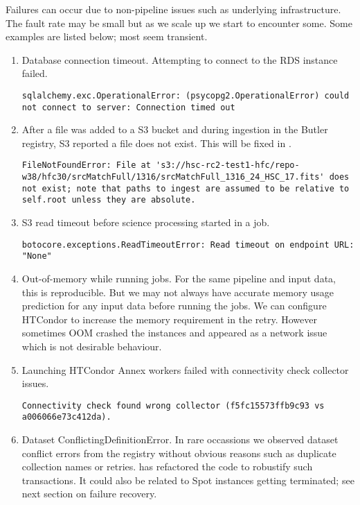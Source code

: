 Failures can occur due to non-pipeline issues such as underlying infrastructure.
The fault rate may be small but as we scale up we start to encounter some.
Some examples are listed below; most seem transient.


\begin{enumerate}
\item Database connection timeout. Attempting to connect to the RDS instance failed.
\begin{lstlisting}[style=basherror]
sqlalchemy.exc.OperationalError: (psycopg2.OperationalError) could not connect to server: Connection timed out
\end{lstlisting}
\item
After a file was added to a S3 bucket and during ingestion in the Butler registry, S3 reported a file does not exist.
This will be fixed in .
\begin{lstlisting}[style=basherror]
FileNotFoundError: File at 's3://hsc-rc2-test1-hfc/repo-w38/hfc30/srcMatchFull/1316/srcMatchFull_1316_24_HSC_17.fits' does not exist; note that paths to ingest are assumed to be relative to self.root unless they are absolute.
\end{lstlisting}
\item S3 read timeout before science processing started in a job.
\begin{lstlisting}[style=basherror]
botocore.exceptions.ReadTimeoutError: Read timeout on endpoint URL: "None"
\end{lstlisting}
\item Out-of-memory while running jobs.
For the same pipeline and input data, this is reproducible.
But we may not always have accurate memory usage prediction for any input data before running the jobs.
We can configure HTCondor to increase the memory requirement in the retry.
However sometimes OOM crashed the instances and appeared as a network issue which is not  desirable behaviour.
\item Launching HTCondor Annex workers failed with connectivity check collector issues.
\begin{lstlisting}[style=basherror]
Connectivity check found wrong collector (f5fc15573ffb9c93 vs a006066e73c412da).
\end{lstlisting}
\item Dataset ConflictingDefinitionError.
In rare occassions we observed dataset conflict errors from the registry without obvious reasons such as duplicate collection names or retries.
 has refactored the code to robustify such transactions.
It could also be related to Spot instances getting terminated;
see next section on failure recovery.
\end{enumerate}


